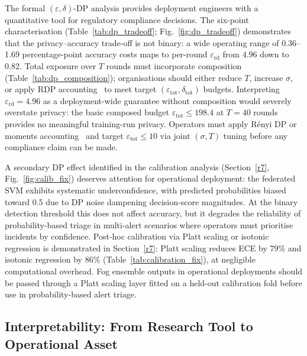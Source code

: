 \documentclass[sensors,article,submit,pdftex,moreauthors]{Definitions/mdpi}
\begin{document}
The formal $(\varepsilon,\delta)$-DP analysis provides deployment engineers with a quantitative tool for regulatory compliance decisions. The six-point characterisation (Table~\ref{tab:dp_tradeoff}; Fig.~\ref{fig:dp_tradeoff}) demonstrates that the privacy--accuracy trade-off is not binary: a wide operating range of 0.36--1.69 percentage-point accuracy costs maps to per-round $\varepsilon_{\mathrm{rd}}$ from 4.96 down to 0.82. Total exposure over $T$ rounds must incorporate composition (Table~\ref{tab:dp_composition}); organisations should either reduce $T$, increase $\sigma$, or apply RDP accounting~\cite{abadi2016deep} to meet target $(\varepsilon_{\mathrm{tot}},\delta_{\mathrm{tot}})$ budgets. Interpreting $\varepsilon_{\mathrm{rd}}{=}4.96$ as a deployment-wide guarantee without composition would severely overstate privacy: the basic composed budget $\varepsilon_{\mathrm{tot}}{\leq}198.4$ at $T{=}40$ rounds provides no meaningful training-run privacy. Operators must apply R\'{e}nyi DP or moments accounting~\cite{abadi2016deep} and target $\varepsilon_{\mathrm{tot}}{\leq}10$ via joint $(\sigma,T)$ tuning before any compliance claim can be made.

A secondary DP effect identified in the calibration analysis (Section~\ref{r7}, Fig.~\ref{fig:calib_fix}) deserves attention for operational deployment: the federated SVM exhibits systematic underconfidence, with predicted probabilities biased toward 0.5 due to DP noise dampening decision-score magnitudes. At the binary detection threshold this does not affect accuracy, but it degrades the reliability of probability-based triage in multi-alert scenarios where operators must prioritise incidents by confidence. Post-hoc calibration via Platt scaling or isotonic regression is demonstrated in Section~\ref{r7}: Platt scaling reduces ECE by 79\% and isotonic regression by 86\% (Table~\ref{tab:calibration_fix}), at negligible computational overhead. Fog ensemble outputs in operational deployments should be passed through a Platt scaling layer fitted on a held-out calibration fold before use in probability-based alert triage.

\subsection{Interpretability: From Research Tool to Operational Asset}
\end{document}
